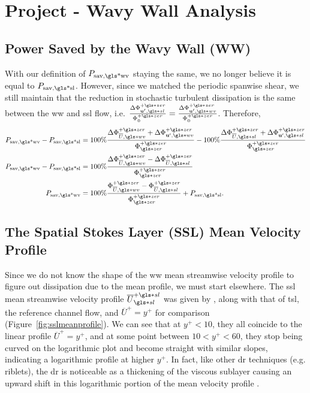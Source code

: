 \chapter{Project - Wavy Wall Analysis}\glsresetall
\section{Power Saved by the Wavy Wall (WW)}
With our definition of $P_\text{sav,\gls*{wv}}$ staying the same, we no longer believe it is equal to $P_\text{sav,\gls*{sl}}$. However, since we matched the periodic spanwise shear, we still maintain that the reduction in stochastic turbulent dissipation is the same between the \gls*{ww} and \gls*{ssl} flow, i.e. $\frac{\Delta \Phi _{\mathbf{u} ',\gls*{sl}}\pz}{\Phi _{0}\pz}=\frac{\Delta \Phi _{\mathbf{u} ',\gls*{wv}}\pz}{\Phi _{0}\pz}$. Therefore,
\begin{align}
	P_\text{sav,\gls*{wv}}	-P_\text{sav,\gls*{sl}} &= 100\%\frac{\Delta \Phi _{\overline{U },\gls*{wv}}\pz+\Delta \Phi _{\mathbf{u} ',\gls*{wv}}\pz}{\Phi \zz\pz}-100\% \frac{\Delta \Phi _{\overline{U },\gls*{sl}}\pz+\Delta \Phi _{\mathbf{u} ',\gls*{sl}}\pz}{\Phi \zz\pz}\\
	P_\text{sav,\gls*{wv}}	-P_\text{sav,\gls*{sl}}  &= 100\% \frac{\Delta \Phi _{\overline{U },\gls*{wv}}\pz-\Delta \Phi _{\overline{U },\gls*{sl}}\pz}{\Phi \zz\pz}\\
	P_\text{sav,\gls*{wv}} &= 100\% \frac{ \Phi _{\overline{U },\gls*{wv}}\pz-\Phi _{\overline{U },\gls*{sl}}\pz}{\Phi \zz\pz}+P_\text{sav,\gls*{sl}}\label{eq:psavwpsavs}
.\end{align}


\section{The Spatial Stokes Layer (SSL) Mean Velocity Profile}\label{sec:sslmean}
Since we do not know the shape of the \gls*{ww} mean streamwise velocity profile to figure out dissipation due to the mean profile, we must start elsewhere. The \gls*{ssl} mean streamwise velocity profile $\overline{U}\ssl\ps$ was given by \vqt, along with that of \gls*{tsl}, the reference channel flow, and $\overline{U}^{+}=y^{+}$ for comparison (Figure~\ref{fig:sslmeanprofile}). We can see that at $y^{+}<10$, they all coincide to the linear profile $\overline{U}^{+}=y^{+}$, and at some point between $10<y^{+}<60$, they stop being curved on the logarithmic plot and become straight with similar slopes, indicating a logarithmic profile at higher $y^{+}$. In fact, like other \gls*{dr} techniques (e.g. riblets), the \gls*{dr} is noticeable as a thickening of the viscous sublayer causing an upward shift in this logarithmic portion of the mean velocity profile \cite{viotti2009,choi1989,luchini1996}. 

